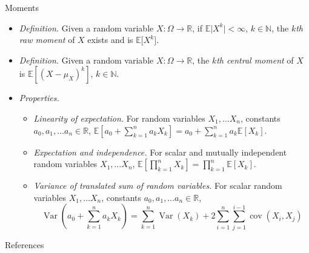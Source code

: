 \documentclass{beamer}
\numberwithin{equation}{section}
\begin{document}
\begin{frame}{Moments}
    \begin{itemize}
        \item
        \textit{Definition.} Given a random variable $ X : \Omega \rightarrow
        \mathbb{R} $, if $ \mathbb{E}\big|X^k\big| < \infty $,
        $ k \in \mathbb{N} $, the $ k $\textit{th raw moment} of $ X $ exists
        \cite{wasserman_stats} and is $ \mathbb{E}\big[X^k\big] $.

        \item
        \textit{Definition.} Given a random variable $ X : \Omega \rightarrow
        \mathbb{R} $, the $ k $\textit{th central moment} of $ X $ is
        $ \mathbb{E}\left[(X - \mu_X)^k\right] $, $ k \in \mathbb{N} $.

         \item
         \textit{Properties.}
         \begin{itemize}
             \item
             \textit{Linearity of expectation.} For random variables
             $ X_1, \ldots X_n $, constants
             $ a_0, a_1, \ldots a_n \in \mathbb{R} $,
             $ \mathbb{E}\left[a_0 + \sum_{k = 1}^na_kX_k\right] =
             a_0 + \sum_{k = 1}^na_k\mathbb{E}[X_k] $.

            \item
            \textit{Expectation and independence.} For scalar and mutually
            independent random variables $ X_1, \ldots X_n $,
            $ \mathbb{E}\left[\prod_{k = 1}^nX_k\right] =
            \prod_{k = 1}^n\mathbb{E}[X_k] $.

            \item
            \textit{Variance of translated sum of random variables.} For scalar random
            variables $ X_1, \ldots X_n $, constants
            $ a_0, a_1, \ldots a_n \in \mathbb{R} $,
            \begin{equation*}
                \operatorname{Var}\left(a_0 + \sum_{k = 1}^na_kX_k\right) =
                \sum_{k = 1}^n\operatorname{Var}(X_k) +
                2\sum_{i = 1}^n\sum_{j = 1}^{i - 1}\operatorname{cov}(X_i, X_j)
            \end{equation*}
         \end{itemize}
    \end{itemize}
\end{frame}

\begin{frame}{References}
    
    
\end{frame}
\end{document}
